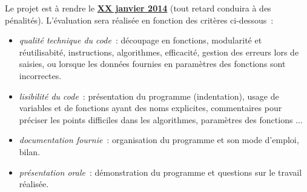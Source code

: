 \documentclass[10pt]{article}
\begin{document}
Le projet est à rendre le \underline{\bf XX janvier 2014} 
(tout retard conduira à des pénalités). L'évaluation sera réalisée en fonction 
des critères ci-dessous~:
\begin{itemize}

\item  \textit{qualité technique du code}~: découpage en fonctions, modularité et réutilisabité, instructions, algorithmes, efficacité, gestion des erreurs lors de saisies, ou lorsque les données fournies en paramètres des fonctions sont incorrectes.

\item \textit{lisibilité du code}~: présentation du programme (indentation), usage de variables et de fonctions ayant des noms explicites, commentaires pour préciser les points difficiles dans les algorithmes, paramètres des fonctions $\ldots$ 

\item \textit{documentation fournie}~: organisation du programme et son mode d'emploi, bilan.

\item \textit{présentation orale}~: démonstration du programme et questions sur le travail réalisée.

\end{itemize}
\end{document}
